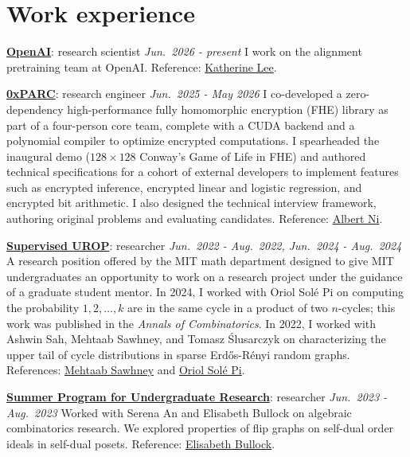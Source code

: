 \documentclass[12pt,a4paper,sans]{moderncv}
\newcommand{\datedline}[2]{#1 \hfill \emph{#2}}
\newcommand{\entry}[4]{%
  \datedline{\textbf{#1}: #2}{#3}\newline
  {\small #4}}
\begin{document}
\makecvtitle

\section{Work experience}
\entry
  {\href{https://openai.com/}{OpenAI}}
  {research scientist}
  {Jun.\ 2026 - present}
  {I work on the alignment pretraining team at OpenAI.
   Reference: \href{mailto:katelee168@gmail.com}{Katherine Lee}.}

\bigskip
\entry
  {\href{https://0xparc.org/}{0xPARC}}
  {research engineer}
  {Jun.\ 2025 - May 2026}
  {I co-developed a zero-dependency high-performance fully homomorphic encryption (FHE)
   library as part of a four-person core team, complete with a CUDA backend and a polynomial
   compiler to optimize encrypted computations. I spearheaded the inaugural demo
   ($128 \times 128$ Conway's Game of Life in FHE) and authored technical specifications for
   a cohort of external developers to implement features such as encrypted inference,
   encrypted linear and logistic regression, and encrypted bit arithmetic. I also designed
   the technical interview framework, authoring original problems and evaluating candidates.
   Reference: \href{mailto:albert@0xparc.org}{Albert Ni}.}

\bigskip
\entry
  {\href{https://math.mit.edu/research/undergraduate/urop-plus/}{Supervised UROP}}
  {researcher}
  {Jun.\ 2022 - Aug.\ 2022, Jun.\ 2024 - Aug.\ 2024}
  {A research position offered by the MIT math department designed to give MIT undergraduates
   an opportunity to work on a research project under the guidance of a graduate student
   mentor. In 2024, I worked with Oriol Solé Pi on computing the probability $1, 2, \dots, k$
   are in the same cycle in a product of two $n$-cycles; this work was published in the
   \emph{Annals of Combinatorics}. In 2022, I worked with Ashwin Sah, Mehtaab Sawhney, and
   Tomasz Ślusarczyk on characterizing the upper tail of cycle distributions in sparse
   Erdős-Rényi random graphs. References: \href{mailto:msawhney@mit.edu}{Mehtaab Sawhney} and
   \href{mailto:oriolsp@mit.edu}{Oriol Solé Pi}.}

\bigskip
\entry
  {\href{https://math.mit.edu/research/undergraduate/spur/index.php}{Summer Program for Undergraduate Research}}
  {researcher}
  {Jun.\ 2023 - Aug.\ 2023}
  {Worked with Serena An and Elisabeth Bullock on algebraic combinatorics research. We
   explored properties of flip graphs on self-dual order ideals in self-dual posets.
   Reference: \href{mailto:edb22@mit.edu}{Elisabeth Bullock}.}
\end{document}
